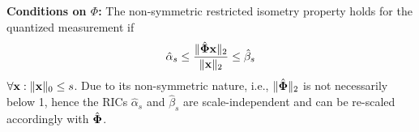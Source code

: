 \documentclass{article}
\begin{document}
 


{\bf Conditions on ${\Phi}$:} The non-symmetric restricted isometry property holds for the quantized measurement if
\begin{equation}
\small
    \hat{\alpha}_{s} \leq \frac{\|\hat{{\bf \Phi}} {\bf x}\|_2}{\|{\bf x}\|_2} \leq \hat{\beta}_{s}
\end{equation}
$\forall {\bf x}: \| {\bf x}\|_0 \leq s$. Due to its non-symmetric nature, i.e., $\| \hat{\bf \Phi}\|_2$ is not necessarily below 1, hence the RICs $\hat{\alpha}_s$ and $\hat{\beta}_s$ are scale-independent and can be re-scaled accordingly with $\hat{\bf \Phi}$.

\end{document}
